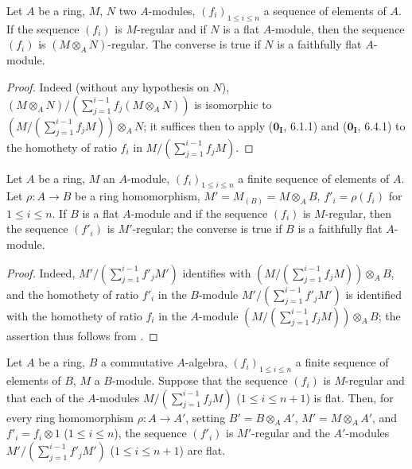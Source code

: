 \begin{proposition}[15.1.13]
\label{0.15.1.13}
Let $A$ be a ring, $M$, $N$ two $A$-modules, $(f_i)_{1\leq i\leq n}$ a sequence of elements of $A$.
If the sequence $(f_i)$ is $M$-regular and if $N$ is a flat $A$-module, then the sequence $(f_i)$ is $(M\otimes_AN)$-regular.
The converse is true if $N$ is a faithfully flat $A$-module.
\end{proposition}

\begin{proof}
Indeed (without any hypothesis on $N$), $(M\otimes_AN)/(\sum_{j=1}^{i-1}f_j(M\otimes_AN))$ is isomorphic to $(M/(\sum_{j=1}^{i-1}f_jM))\otimes_AN$;
it suffices then to apply ($\mathbf{0_I}$, 6.1.1) and ($\mathbf{0_I}$, 6.4.1) to the homothety of ratio $f_i$ in $M/(\sum_{j=1}^{i-1}f_jM)$.
\end{proof}

\begin{corollary}[15.1.14]
\label{0.15.1.14}
Let $A$ be a ring, $M$ an $A$-module, $(f_i)_{1\leq i\leq n}$ a finite sequence of elements of $A$.
Let $\rho:A\to B$ be a ring homomorphism, $M'=M_{(B)}=M\otimes_AB$, $f'_i=\rho(f_i)$ for $1\leq i\leq n$.
If $B$ is a flat $A$-module and if the sequence $(f_i)$ is $M$-regular, then the sequence $(f'_i)$ is $M'$-regular;
the converse is true if $B$ is a faithfully flat $A$-module.
\end{corollary}

\begin{proof}
Indeed, $M'/(\sum_{j=1}^{i-1}f'_jM')$ identifies with $(M/(\sum_{j=1}^{i-1}f_jM))\otimes_AB$, and the homothety of ratio $f'_i$ in the $B$-module $M'/(\sum_{j=1}^{i-1}f'_jM')$ is identified with the homothety of ratio $f_i$ in the $A$-module $(M/(\sum_{j=1}^{i-1}f_jM))\otimes_AB$;
the assertion thus follows from .
\end{proof}

\begin{proposition}[15.1.15]
\label{0.15.1.15}
Let $A$ be a ring, $B$ a commutative $A$-algebra, $(f_i)_{1\leq i\leq n}$ a finite sequence of elements of $B$, $M$ a $B$-module.
Suppose that the sequence $(f_i)$ is $M$-regular and that each of the $A$-modules $M/(\sum_{j=1}^{i-1}f_jM)$ ($1\leq i\leq n+1$) is flat.
Then, for every ring homomorphism $\rho:A\to A'$, setting $B'=B\otimes_AA'$, $M'=M\otimes_AA'$, and $f'_i=f_i\otimes 1$ ($1\leq i\leq n$), the sequence $(f'_i)$ is $M'$-regular and the $A'$-modules $M'/(\sum_{j=1}^{i-1}f'_jM')$ ($1\leq i\leq n+1$) are flat.
\end{proposition}

